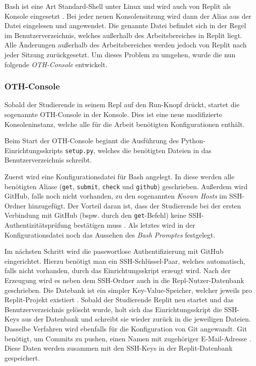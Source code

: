 Bash ist eine Art \glqq Standard-Shell\grqq{} unter Linux und wird auch von
Replit als Konsole eingesetzt \parencite{bash}. Bei jeder neuen Konsolensitzung
wird dann der Alias aus der Datei eingelesen und angewendet. Die genannte Datei
befindet sich in der Regel im Benutzerverzeichnis, welches außerhalb des
Arbeitsbereiches in Replit liegt. Alle Änderungen außerhalb des Arbeitsbereiches
werden jedoch von Replit nach jeder Sitzung zurückgesetzt. Um dieses Problem zu
umgehen, wurde die nun folgende \emph{OTH-Console} entwickelt.

\subsubsection{OTH-Console}\label{replit-template-oth-console}
Sobald der Studierende in seinem Repl auf den Run-Knopf drückt, startet die
sogenannte OTH-Console in der Konsole. Dies ist eine neue
modifizierte Konsoleninstanz, welche alle für die Arbeit benötigten
Konfigurationen enthält.

Beim Start der OTH-Console beginnt die Ausführung des Python-Einrichtungsskripts
\texttt{setup.py}, welches die benötigten Dateien in das Benutzerverzeichnis
schreibt.

Zuerst wird eine Konfigurationsdatei für Bash angelegt. In diese werden alle
benötigten Aliase (\texttt{get}, \texttt{submit}, \texttt{check} und
\texttt{github}) geschrieben. Außerdem wird GitHub, falls noch nicht vorhanden,
zu den sogenannten \emph{Known Hosts} im SSH-Ordner hinzugefügt. Der Vorteil
daran ist, dass der Studierende bei der ersten Verbindung mit GitHub (bspw. durch
den \texttt{get}-Befehl) keine SSH-Authentizitätsprüfung bestätigen muss
\parencite{ssh}. Als letztes wird in der Konfigurationsdatei noch das Aussehen
des \emph{Bash Promptes} festgelegt.

Im nächsten Schritt wird die passwortlose Authentifizierung mit GitHub
eingerichtet. Hierzu benötigt man ein SSH-Schlüssel-Paar, welches automatisch,
falls nicht vorhanden, durch das Einrichtungsskript erzeugt wird. Nach der
Erzeugung wird es neben dem SSH-Ordner auch in die Repl-Nutzer-Datenbank
geschrieben. Die Datebank ist ein simpler Key-Value-Speicher, welcher jeweils
pro Replit-Projekt existiert \parencite{replit-database}. Sobald der Studierende
Replit neu startet und das Benutzerverzeichnis gelöscht wurde, holt sich das
Einrichtungsskript die SSH-Keys aus der Datenbank und schreibt sie wieder
zurück in die jeweiligen Dateien. Dasselbe Verfahren wird ebenfalls für die
Konfiguration von Git angewandt. Git benötigt, um Commits zu pushen, einen 
Namen mit zugehöriger E-Mail-Adresse \parencite{git-config}. Diese Daten werden
zusammen mit den SSH-Keys in der Replit-Datenbank gespeichert.

